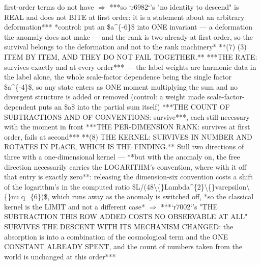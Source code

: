 \begin{description}
first-order terms do not have \ensuremath{\Rightarrow} ***so `r6982`'s "no identity to descend" is REAL and does not BITE at first order: it is a statement about an arbitrary deformation***  *control: put an \$a\textasciicircum{}\{-6\}\$ into ONE invariant --- a deformation the anomaly does not make --- and the rank is two already at first order, so the survival belongs to the deformation and not to the rank machinery*  **(7) (3) ITEM BY ITEM, AND THEY DO NOT FAIL TOGETHER.** ***THE RATE: survives exactly and at every order*** --- the label weights are harmonic data in the label alone, the whole scale-factor dependence being the single factor \$a\textasciicircum{}\{-4\}\$, so any state enters as ONE moment multiplying the sum and no divergent structure is added or removed (control: a weight made scale-factor-dependent puts an \$a\$ into the partial sum itself)  ***THE COUNT OF SUBTRACTIONS AND OF CONVENTIONS: survive***, each still necessary with the moment in front  ***THE PER-DIMENSION RANK: survives at first order, fails at second***  **(8)  THE KERNEL: SURVIVES IN NUMBER AND ROTATES IN PLACE, WHICH IS THE FINDING.** Still two directions of three with a one-dimensional kernel --- **but with the anomaly on, the free direction necessarily carries the LOGARITHM's convention, where with it off that entry is exactly zero**: releasing the dimension-six convention costs a shift of the logarithm's in the computed ratio \$L/(48\textbackslash\{\}Lambda\textasciicircum{}\{2\}\textbackslash\{\}varepsilon\textbackslash\{\}nu q\_\{6\})\$, which runs away as the anomaly is switched off, *so the classical kernel is the LIMIT and not a different case* \ensuremath{\Rightarrow} ***`r7002`'s "THE SUBTRACTION THIS ROW ADDED COSTS NO OBSERVABLE AT ALL" SURVIVES THE DESCENT WITH ITS MECHANISM CHANGED: the absorption is into a combination of the cosmological term and the ONE CONSTANT ALREADY SPENT, and the count of numbers taken from the world is unchanged at this order***

\end{description}

